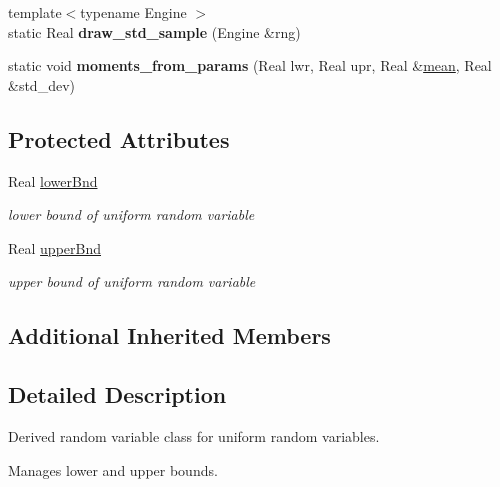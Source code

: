 \begin{DoxyCompactItemize}
\item 
{\footnotesize template$<$typename Engine $>$ }\\static Real {\bfseries draw\+\_\+std\+\_\+sample} (Engine \&rng)\label{classPecos_1_1UniformRandomVariable_a6fcc236683df40e8eb64ea81b5e38de9}

\item 
static void {\bfseries moments\+\_\+from\+\_\+params} (Real lwr, Real upr, Real \&\hyperlink{classPecos_1_1UniformRandomVariable_a962ffe5a3593be370d5c883365c060f4}{mean}, Real \&std\+\_\+dev)\label{classPecos_1_1UniformRandomVariable_aa2fe5db8e1960533b3d1389dcfdd39a8}

\end{DoxyCompactItemize}
\subsection*{Protected Attributes}
\begin{DoxyCompactItemize}
\item 
Real \hyperlink{classPecos_1_1UniformRandomVariable_a346dc528fe624cdf3ebb56fb9539f550}{lower\+Bnd}\label{classPecos_1_1UniformRandomVariable_a346dc528fe624cdf3ebb56fb9539f550}

\begin{DoxyCompactList}\small\item\em lower bound of uniform random variable \end{DoxyCompactList}\item 
Real \hyperlink{classPecos_1_1UniformRandomVariable_a671794a0fe385a29a595e98f44cde031}{upper\+Bnd}\label{classPecos_1_1UniformRandomVariable_a671794a0fe385a29a595e98f44cde031}

\begin{DoxyCompactList}\small\item\em upper bound of uniform random variable \end{DoxyCompactList}\end{DoxyCompactItemize}
\subsection*{Additional Inherited Members}


\subsection{Detailed Description}
Derived random variable class for uniform random variables. 

Manages lower and upper bounds. 

